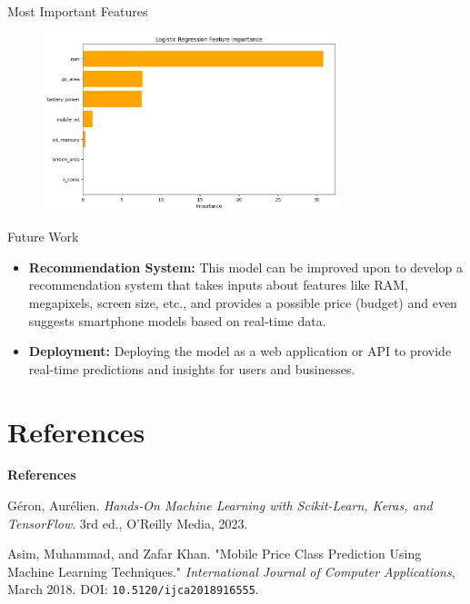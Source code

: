 \documentclass[14pt, aspectratio=169]{beamer}
\begin{document}
\begin{frame}{Most Important Features}
  
  \begin{figure}[H]
    \centering
    \includegraphics[height=14em]{feature_importance.png}
    \label{most_imp_feature}
  \end{figure}
\end{frame}
  
\begin{frame}{Future Work}
  \begin{itemize}
    \setlength\itemsep{1em}
    \item \textbf{Recommendation System:} This model can be improved upon to develop a recommendation system that takes inputs about features like RAM, megapixels, screen size, etc., and provides a possible price (budget) and even suggests smartphone models based on real-time data.
    \item \textbf{Deployment:} Deploying the model as a web application or API to provide real-time predictions and insights for users and businesses.
  \end{itemize}
\end{frame}

\section{References}
\begin{frame}{}
  \Huge
  \centering
  \textbf{References}
  \normalsize
\end{frame}
\begin{frame}{}
  \footnotesize
  \begin{thebibliography}{9}
    Géron, Aurélien. \textit{Hands-On Machine Learning with Scikit-Learn, Keras, and TensorFlow}. 3rd ed., O'Reilly Media, 2023.
  
    Asim, Muhammad, and Zafar Khan. "Mobile Price Class Prediction Using Machine Learning Techniques." \textit{International Journal of Computer Applications}, March 2018. DOI: \texttt{10.5120/ijca2018916555}.
  
  \end{thebibliography}
\end{frame}
\end{document}
